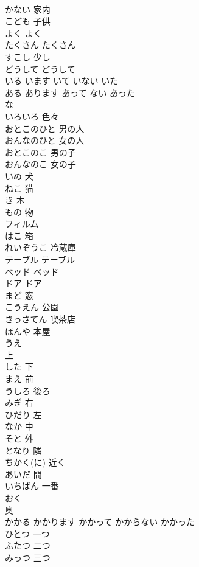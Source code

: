 \documentclass[8pt]{extreport}
\begin{document}
\begin{CJK}{UTF8}{min}
\\	かない	家内
\\	こども	子供
\\	よく	よく
\\	たくさん	たくさん
\\	すこし	少し
\\	どうして	どうして
\\	いる	います	いて	いない	いた	
\\	ある	あります	あって	ない	あった	
\\	な 
\\	いろいろ	色々
\\	おとこのひと	男の人
\\	おんなのひと	女の人
\\	おとこのこ	男の子
\\	おんなのこ	女の子
\\	いぬ	犬
\\	ねこ	猫
\\	き	木
\\	もの	物
\\	フィルム	
\\	はこ	箱
\\	れいぞうこ	冷蔵庫
\\	テーブル	テーブル
\\	ベッド	ベッド
\\	ドア	ドア
\\	まど	窓
\\	こうえん	公園
\\	きっさてん	喫茶店
\\	ほんや	本屋
\\	うえ	
\\	上
\\	した	下
\\	まえ	前
\\	うしろ	後ろ
\\	みぎ	右
\\	ひだり	左
\\	なか	中
\\	そと	外
\\	となり	隣
\\	ちかく(に)	近く
\\	あいだ	間
\\	いちばん	一番
\\	おく	
\\	奥
\\	かかる	かかります	かかって	かからない	かかった	
\\	ひとつ	一つ
\\	ふたつ	二つ
\\	みっつ	三つ

\end{CJK}
\end{document}
